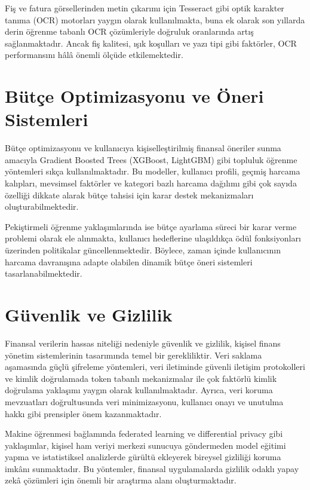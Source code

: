 Fiş ve fatura görsellerinden metin çıkarımı için Tesseract gibi optik karakter tanıma (OCR) motorları yaygın olarak kullanılmakta, buna ek olarak son yıllarda derin öğrenme tabanlı OCR çözümleriyle doğruluk oranlarında artış sağlanmaktadır. Ancak fiş kalitesi, ışık koşulları ve yazı tipi gibi faktörler, OCR performansını hâlâ önemli ölçüde etkilemektedir.

\section{Bütçe Optimizasyonu ve Öneri Sistemleri}

Bütçe optimizasyonu ve kullanıcıya kişiselleştirilmiş finansal öneriler sunma amacıyla Gradient Boosted Trees (XGBoost, LightGBM) gibi topluluk öğrenme yöntemleri sıkça kullanılmaktadır. Bu modeller, kullanıcı profili, geçmiş harcama kalıpları, mevsimsel faktörler ve kategori bazlı harcama dağılımı gibi çok sayıda özelliği dikkate alarak bütçe tahsisi için karar destek mekanizmaları oluşturabilmektedir.

Pekiştirmeli öğrenme yaklaşımlarında ise bütçe ayarlama süreci bir karar verme problemi olarak ele alınmakta, kullanıcı hedeflerine ulaşıldıkça ödül fonksiyonları üzerinden politikalar güncellenmektedir. Böylece, zaman içinde kullanıcının harcama davranışına adapte olabilen dinamik bütçe öneri sistemleri tasarlanabilmektedir.

\section{Güvenlik ve Gizlilik}

Finansal verilerin hassas niteliği nedeniyle güvenlik ve gizlilik, kişisel finans yönetim sistemlerinin tasarımında temel bir gerekliliktir. Veri saklama aşamasında güçlü şifreleme yöntemleri, veri iletiminde güvenli iletişim protokolleri ve kimlik doğrulamada token tabanlı mekanizmalar ile çok faktörlü kimlik doğrulama yaklaşımı yaygın olarak kullanılmaktadır. Ayrıca, veri koruma mevzuatları doğrultusunda veri minimizasyonu, kullanıcı onayı ve unutulma hakkı gibi prensipler önem kazanmaktadır.

Makine öğrenmesi bağlamında federated learning ve differential privacy gibi yaklaşımlar, kişisel ham veriyi merkezi sunucuya göndermeden model eğitimi yapma ve istatistiksel analizlerde gürültü ekleyerek bireysel gizliliği koruma imkânı sunmaktadır. Bu yöntemler, finansal uygulamalarda gizlilik odaklı yapay zekâ çözümleri için önemli bir araştırma alanı oluşturmaktadır.


